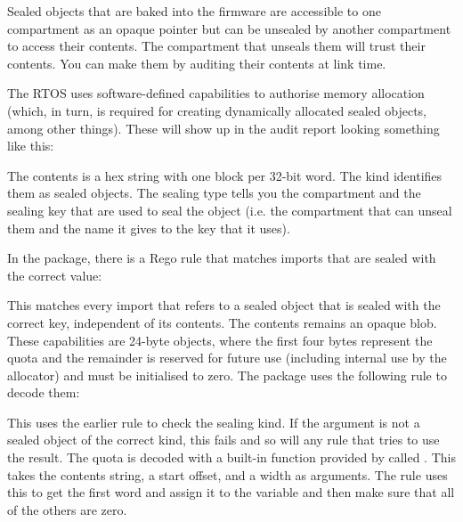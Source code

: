 {Sealed objects that are baked into the firmware are accessible to one compartment as an opaque pointer but can be unsealed by another compartment to access their contents.
The compartment that unseals them will trust their contents.
You can make them  by auditing their contents at link time.

The RTOS uses software-defined capabilities to authorise memory allocation (which, in turn, is required for creating dynamically allocated sealed objects, among other things).
These will show up in the audit report looking something like this:

\begin{jsonsnippet}
{
  "contents": "00040000 00000000 00000000 00000000 00000000 00000000",
  "kind": "SealedObject",
  "sealing_type": {
    "compartment": "allocator",
    "key": "MallocKey",
    "provided_by": "build/cheriot/cheriot/release/cheriot.allocator.compartment",
    "symbol": "__export.sealing_type.allocator.MallocKey"
  \}
\}
\end{jsonsnippet}

The contents is a hex string with one block per 32-bit word.
The kind identifies them as sealed objects.
The sealing type tells you the compartment and the sealing key that are used to seal the object (i.e. the compartment that can unseal them and the name it gives to the key that it uses).

In the  package, there is a Rego rule that matches imports that are sealed with the correct value:

\regolisting[filename=examples/auditing-rtos/rtos.rego,marker=isallocator,label=lst:isallocatorrego,caption="The Rego rule for matching objects sealed as allocator capabilities"]{}

This matches every import that refers to a sealed object that is sealed with the correct key, independent of its contents.
The contents remains an opaque blob.
These capabilities are 24-byte objects, where the first four bytes represent the quota and the remainder is reserved for future use (including internal use by the allocator) and must be initialised to zero.
The  package uses the following rule to decode them:

\regolisting[filename=examples/auditing-rtos/rtos.rego,marker=decodeallocator,label=lst:decodeallocatorrego,caption="The Rego rule for decoding allocator capabilities"]{}

This uses the earlier rule to check the sealing kind.
If the argument is not a sealed object of the correct kind, this fails and so will any rule that tries to use the result.
The quota is decoded with a built-in function provided by  called .
This takes the contents string, a start offset, and a width as arguments.
The rule uses this to get the first word and assign it to the  variable and then make sure that all of the others are zero.

}
